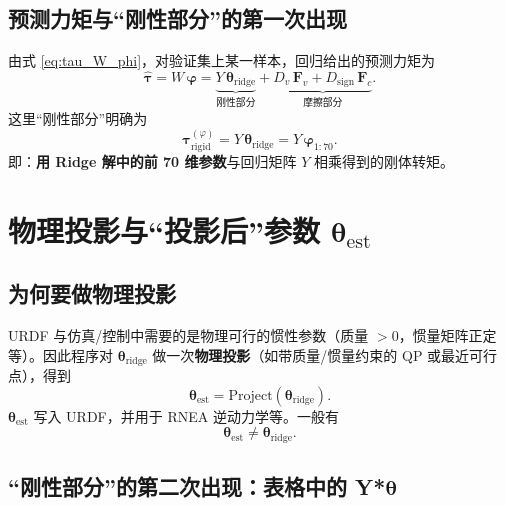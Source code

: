 \documentclass[12pt,a4paper]{article}
\begin{document}
\subsection{预测力矩与``刚性部分''的第一次出现}

由式 \eqref{eq:tau_W_phi}，对验证集上某一样本，回归给出的预测力矩为
\begin{equation}
  \widehat{\bm{\tau}} = W\,\bm{\varphi} = \underbrace{Y\,\bm{\theta}_{\mathrm{ridge}}}_{\text{刚性部分}} + \underbrace{D_v\,\bm{F}_v + D_{\mathrm{sign}}\,\bm{F}_c}_{\text{摩擦部分}}.
  \label{eq:tau_hat_ridge}
\end{equation}
这里``刚性部分''明确为
\begin{equation}
  \boxed{\ \bm{\tau}_{\mathrm{rigid}}^{(\varphi)} = Y\,\bm{\theta}_{\mathrm{ridge}} = Y\,\bm{\varphi}_{1:70}.\ }
  \label{eq:rigid_ridge}
\end{equation}
即：\textbf{用 Ridge 解中的前 70 维参数}与回归矩阵 $Y$ 相乘得到的刚体转矩。

\section{物理投影与``投影后''参数 \texorpdfstring{$\bm{\theta}_{\mathrm{est}}$}{θ\_est}}

\subsection{为何要做物理投影}

URDF 与仿真/控制中需要的是物理可行的惯性参数（质量 $>0$，惯量矩阵正定等）。因此程序对 $\bm{\theta}_{\mathrm{ridge}}$ 做一次\textbf{物理投影}（如带质量/惯量约束的 QP 或最近可行点），得到
\begin{equation}
  \bm{\theta}_{\mathrm{est}} = \mathrm{Project}(\bm{\theta}_{\mathrm{ridge}}).
  \label{eq:theta_est}
\end{equation}
$\bm{\theta}_{\mathrm{est}}$ 写入 URDF，并用于 RNEA 逆动力学等。一般有
\begin{equation}
  \bm{\theta}_{\mathrm{est}} \neq \bm{\theta}_{\mathrm{ridge}}.
  \label{eq:theta_diff}
\end{equation}

\subsection{``刚性部分''的第二次出现：表格中的 Y*\texorpdfstring{$\bm{\theta}$}{θ}}
\end{document}
